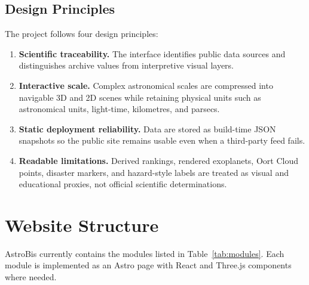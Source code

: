 \documentclass[11pt,a4paper]{article}
\begin{document}
\subsection{Design Principles}

The project follows four design principles:

\begin{enumerate}[leftmargin=*]
  \item \textbf{Scientific traceability.} The interface identifies public data sources and distinguishes archive values from interpretive visual layers.
  \item \textbf{Interactive scale.} Complex astronomical scales are compressed into navigable 3D and 2D scenes while retaining physical units such as astronomical units, light-time, kilometres, and parsecs.
  \item \textbf{Static deployment reliability.} Data are stored as build-time JSON snapshots so the public site remains usable even when a third-party feed fails.
  \item \textbf{Readable limitations.} Derived rankings, rendered exoplanets, Oort Cloud points, disaster markers, and hazard-style labels are treated as visual and educational proxies, not official scientific determinations.
\end{enumerate}

\section{Website Structure}

AstroBis currently contains the modules listed in Table~\ref{tab:modules}. Each module is implemented as an Astro page with React and Three.js components where needed.
\end{document}
